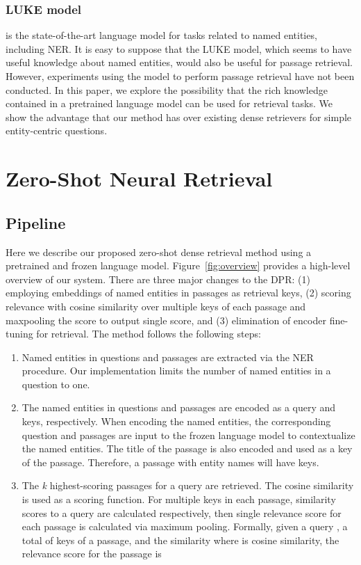 \documentclass[letterpaper]{article} \usepackage{aaai23}  \usepackage{times}  \usepackage{helvet}  \usepackage{courier}  \usepackage[hyphens]{url}  \usepackage{graphicx} \urlstyle{rm} \def\UrlFont{\rm}  \usepackage{natbib}  \usepackage{caption} \frenchspacing  \setlength{\pdfpagewidth}{8.5in}  \setlength{\pdfpageheight}{11in}  \usepackage{algorithm}
\begin{document}
\subsubsection{LUKE model} \citep{yamada-etal-2020-luke} is the state-of-the-art language model for tasks related to named entities, including NER.
It is easy to suppose that the LUKE model, which seems to have useful knowledge about named entities, would also be useful for passage retrieval.
However, experiments using the model to perform passage retrieval have not been conducted.
In this paper, we explore the possibility that the rich knowledge contained in a pretrained language model can be used for retrieval tasks.
We show the advantage that our method has over existing dense retrievers for simple entity-centric questions.


\section{Zero-Shot Neural Retrieval}\label{sec:method}
\subsection{Pipeline}\label{sec:pipeline}
Here we describe our proposed zero-shot dense retrieval method using a pretrained and frozen language model.
Figure~\ref{fig:overview} provides a high-level overview of our system.
There are three major changes to the DPR: (1) employing embeddings of named entities in passages as retrieval keys, (2) scoring relevance with cosine similarity over multiple keys of each passage and maxpooling the score to output single score, and (3) elimination of encoder fine-tuning for retrieval.
The method follows the following steps:
\begin{enumerate}
	\item Named entities in questions and passages are extracted via the NER procedure.
	      Our implementation limits the number of named entities in a question to one.
	\item The named entities in questions and passages are encoded as a query and keys, respectively.
	      When encoding the named entities, the corresponding question and passages are input to the frozen language model to contextualize the named entities.
	      The title of the passage is also encoded and used as a key of the passage.
	      Therefore, a passage with  entity names will have  keys.
	\item The \textit{k} highest-scoring passages for a query are retrieved.
	      The cosine similarity is used as a scoring function.
	      For multiple keys in each passage, similarity scores to a query are calculated respectively, then single relevance score for each passage is calculated via maximum pooling.
	      Formally, given a query , a total of  keys  of a passage, and the similarity  where  is cosine similarity, the relevance score for the passage is
	      
\end{enumerate}
\end{document}
